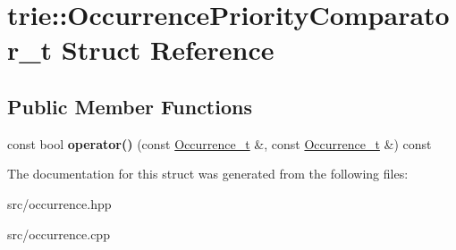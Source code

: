 \hypertarget{structtrie_1_1OccurrencePriorityComparator__t}{}\section{trie\+:\+:Occurrence\+Priority\+Comparator\+\_\+t Struct Reference}
\label{structtrie_1_1OccurrencePriorityComparator__t}
\subsection*{Public Member Functions}
\begin{DoxyCompactItemize}
\item 
const bool {\bfseries operator()} (const \hyperlink{structtrie_1_1Occurrence__t}{Occurrence\+\_\+t} \&, const \hyperlink{structtrie_1_1Occurrence__t}{Occurrence\+\_\+t} \&) const \hypertarget{structtrie_1_1OccurrencePriorityComparator__t_a5aa9e9a1b9429b496241f78e4a6b127c}{}\label{structtrie_1_1OccurrencePriorityComparator__t_a5aa9e9a1b9429b496241f78e4a6b127c}

\end{DoxyCompactItemize}


The documentation for this struct was generated from the following files\+:\begin{DoxyCompactItemize}
\item 
src/occurrence.\+hpp\item 
src/occurrence.\+cpp\end{DoxyCompactItemize}
